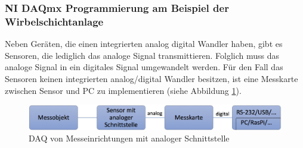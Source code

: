 \subsubsection{NI DAQmx Programmierung am Beispiel der Wirbelschichtanlage}

Neben Geräten, die einen integrierten analog digital Wandler haben, gibt es Sensoren, die lediglich das analoge Signal transmittieren. Folglich muss das analoge Signal in ein digitales Signal umgewandelt werden. Für den Fall das Sensoren keinen integrierten analog/digital Wandler besitzen, ist eine Messkarte zwischen Sensor und PC zu implementieren (siehe Abbildung \ref{fig:sensor_analog_schnittstelle}). \\

\begin{figure}[b!] %
\centering
\includegraphics[width=1\textwidth]{Bilder/sensor_analoge_schnittstelle.jpg}
\vspace{0em}
 \caption[DAQ von Messeinrichtungen mit analoger Schnittstelle]{DAQ von Messeinrichtungen mit analoger Schnittstelle}\label{fig:sensor_analog_schnittstelle}
\end{figure}



